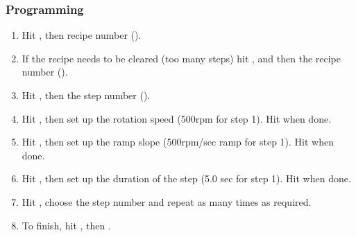 \documentclass[12pt,a4paper]{report}
\begin{document}
\subsubsection{Programming}
\begin{enumerate}
  \item Hit , then recipe number ().
  \item If the recipe needs to be cleared (too many steps) hit ,  and then the recipe number ().
  \item Hit , then the step number ().
  \item Hit , then set up the rotation speed (500rpm for step 1). Hit  when done.
  \item Hit , then set up the ramp slope (500rpm/sec ramp for step 1). Hit  when done.
  \item Hit , then set up the duration of the step (5.0 sec for step 1). Hit  when done.
  \item Hit , choose the step number and repeat as many times as required.
  \item To finish, hit , then .
\end{enumerate}
\end{document}
